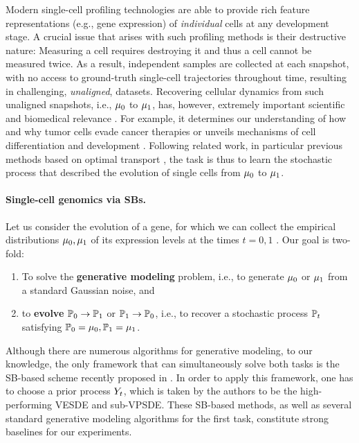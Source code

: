  Modern single-cell profiling technologies are able to provide rich feature representations (e.g., gene expression) of \textit{individual} cells at any development stage. A crucial issue that arises with such profiling methods is their destructive nature: Measuring a cell requires destroying it and thus a cell cannot be measured twice. As a result, independent samples are collected at each snapshot, with no access to ground-truth single-cell trajectories throughout time, resulting in challenging, \emph{unaligned}, datasets.
Recovering cellular dynamics from such unaligned snapshots, i.e., $\mu_0$ to $\mu_1$, has, however, extremely important scientific and biomedical relevance \citep{kulkarni2019beyond}. For example, it determines our understanding of how and why tumor cells evade cancer therapies \citep{frangieh2021multimodal} or unveils mechanisms of cell differentiation and development \citep{schiebinger2019optimal}. Following related work, in particular previous methods based on optimal transport \citep{schiebinger2019optimal, bunne2021learning, bunne2022supervised, tong2020trajectorynet}, the task is thus to learn the stochastic process that described the evolution of single cells from $\mu_0$ to $\mu_1$.

\paragraph{Single-cell genomics via SBs.}
Let us consider the evolution of a gene, for which we can collect the empirical distributions $\mu_0,\mu_1$ of its expression levels at the times $t=0,1$ \citep{schiebinger2019optimal,moon2019visualizing}. Our goal is two-fold: 
\begin{enumerate}[itemsep=.0cm,topsep=0cm]
\item To solve the \textbf{generative modeling} problem, i.e., to generate $\mu_0$ or $\mu_1$ from a standard Gaussian noise, and
\item to \textbf{evolve} $\mathbb{P}_{{0}}\to\mathbb{P}_{{1}}$ or $\mathbb{P}_{{1}}\to\mathbb{P}_{{0}}$, i.e., to recover a stochastic process $\mathbb{P}_{{t}}$ satisfying $\mathbb{P}_{{0}} = \mu_0, \mathbb{P}_{{1}} = \mu_1$.
\end{enumerate}

Although there are numerous algorithms for generative modeling, to our knowledge, the only framework that can simultaneously solve both tasks is the \acrshort{SB}-based scheme recently proposed in \citep{chen2021likelihood}. In order to apply this framework, one has to choose a prior process $Y_{ t }$, which is taken by the authors to be the high-performing \acrshort{VESDE} and sub-\acrshort{VPSDE}. These \acrshort{SB}-based methods, as well as several standard generative modeling algorithms \citep{ho2020denoising, sohl2015deep, song2020score, huang2021variational, song2019generative, song2020score} for the first task, constitute strong baselines for our experiments.


